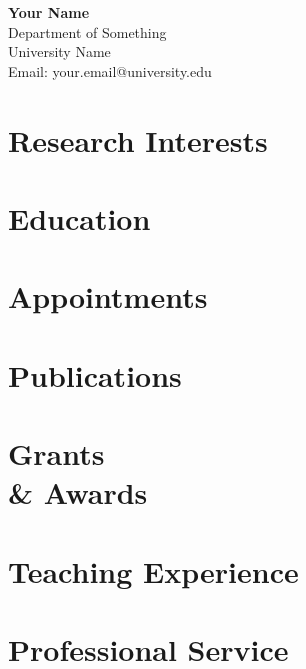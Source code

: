 \documentclass[11pt]{article}
\begin{document}
\begin{center}
    {\Huge \textbf{Your Name}}\\[0.5em]
    Department of Something \\
    University Name\\
    Email: your.email@university.edu
\end{center}

\section*{Research Interests}

\section*{Education}

\section*{Appointments}

\section*{Publications}

\section*{Grants \\ & Awards}

\section*{Teaching Experience}

\section*{Professional Service}
\end{document}
